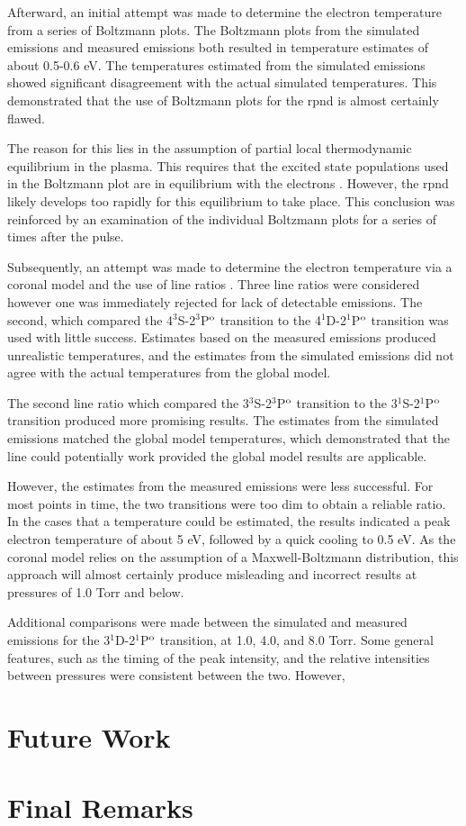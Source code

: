 Afterward, an initial attempt was made to determine the electron temperature
from a series of Boltzmann plots. The Boltzmann plots from the simulated
emissions and measured emissions both resulted in temperature estimates of about
0.5-0.6 eV. The temperatures estimated from the simulated emissions showed
significant disagreement with the actual simulated temperatures. This
demonstrated that the use of Boltzmann plots for the \acs{rpnd} is almost
certainly flawed.

The reason for this lies in the assumption of partial local thermodynamic
equilibrium in the plasma. This requires that the excited state populations used
in the Boltzmann plot are in equilibrium with the electrons \cite{Kunze2009}.
However, the \acs{rpnd} likely develops too rapidly for this equilibrium to take
place. This conclusion was reinforced by an examination of the individual
Boltzmann plots for a series of times after the pulse.

Subsequently, an attempt was made to determine the electron temperature via a
coronal model and the use of line ratios \cite{Griem2005}. Three line ratios
were considered however one was immediately rejected for lack of detectable
emissions. The second, which compared the 4$^3$S-2$^3$P$^\mathrm{o}$ transition to the
4$^1$D-2$^1$P$^\mathrm{o}$ transition was used with little success. Estimates based on
the measured emissions produced unrealistic temperatures, and the estimates from
the simulated emissions did not agree with the actual temperatures from the
global model.

The second line ratio which compared the 3$^3$S-2$^3$P$^\mathrm{o}$ transition to the
3$^1$S-2$^1$P$^\mathrm{o}$ transition produced more promising results. The estimates
from the simulated emissions matched the global model temperatures, which
demonstrated that the line could potentially work provided the global model
results are applicable.

However, the estimates from the measured emissions were less successful. For
most points in time, the two transitions were too dim to obtain a reliable
ratio. In the cases that a temperature could be estimated, the results indicated
a peak electron temperature of about 5 eV, followed by a quick cooling to 0.5
eV. As the coronal model relies on the assumption of a Maxwell-Boltzmann
distribution, this approach will almost certainly produce misleading and
incorrect results at pressures of 1.0 Torr and below.

Additional comparisons were made between the simulated and measured emissions
for the 3$^1$D-2$^1$P$^\mathrm{o}$ transition, at 1.0, 4.0, and 8.0 Torr. Some general
features, such as the timing of the peak intensity, and the relative intensities
between pressures were consistent between the two. However, 

\section{Future Work}



\section{Final Remarks}


